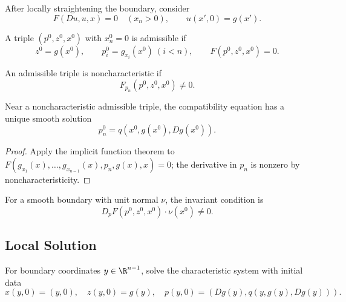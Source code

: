 After locally straightening the boundary, consider
\[
F(Du,u,x)=0\quad(x_n>0),\qquad u(x',0)=g(x').
\]

\begin{definition}
\label{def:compatibility-conditions-admissible-triple}
A triple $(p^0,z^0,x^0)$ with $x_n^0=0$ is admissible if
\[
z^0=g(x^0),\qquad p_i^0=g_{x_i}(x^0)\ (i<n),\qquad
F(p^0,z^0,x^0)=0.
\]
\end{definition}

\begin{definition}
\label{def:noncharacteristic-triple}
An admissible triple is noncharacteristic if
\[
F_{p_n}(p^0,z^0,x^0)\ne0.
\]
\end{definition}

\begin{lemma}
\label{lem:noncharacteristic-boundary-conditions}
Near a noncharacteristic admissible triple, the compatibility equation has a
unique smooth solution
\[
p_n^0=q(x^0,g(x^0),Dg(x^0)).
\]
\end{lemma}

\begin{proof}
\sketch Apply the implicit function theorem to
$F(g_{x_1}(x),\ldots,g_{x_{n-1}}(x),p_n,g(x),x)=0$; the derivative in
$p_n$ is nonzero by noncharacteristicity.
\end{proof}

\begin{remark}
\label{rem:noncharacteristic-condition-general}
For a smooth boundary with unit normal $\nu$, the invariant condition is
\[
D_pF(p^0,z^0,x^0)\cdot\nu(x^0)\ne0.
\]
\end{remark}

\subsection{Local Solution}
\label{sec:characteristics-local-solution}

For boundary coordinates $y\in\R^{n-1}$, solve the characteristic system
with initial data
\[
x(y,0)=(y,0),\quad z(y,0)=g(y),\quad
p(y,0)=(Dg(y),q(y,g(y),Dg(y))).
\]

